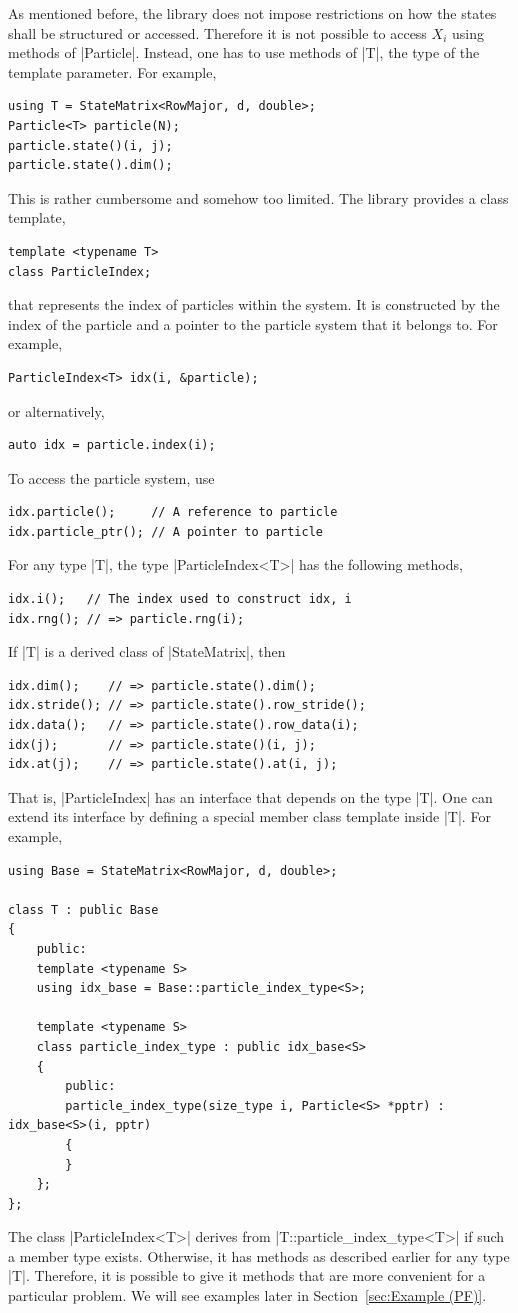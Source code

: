 As mentioned before, the library does not impose restrictions on how the states
shall be structured or accessed. Therefore it is not possible to access $X_i$
using methods of |Particle|. Instead, one has to use methods of |T|, the type
of the template parameter. For example,
\begin{Verbatim}
using T = StateMatrix<RowMajor, d, double>;
Particle<T> particle(N);
particle.state()(i, j);
particle.state().dim();
\end{Verbatim}
This is rather cumbersome and somehow too limited. The library provides a class
template,
\begin{Verbatim}
template <typename T>
class ParticleIndex;
\end{Verbatim}
that represents the index of particles within the system. It is constructed by
the index of the particle and a pointer to the particle system that it belongs
to. For example,
\begin{Verbatim}
ParticleIndex<T> idx(i, &particle);
\end{Verbatim}
or alternatively,
\begin{Verbatim}
auto idx = particle.index(i);
\end{Verbatim}
To access the particle system, use
\begin{Verbatim}
idx.particle();     // A reference to particle
idx.particle_ptr(); // A pointer to particle
\end{Verbatim}
For any type |T|, the type |ParticleIndex<T>| has the following methods,
\begin{Verbatim}
idx.i();   // The index used to construct idx, i
idx.rng(); // => particle.rng(i);
\end{Verbatim}
If |T| is a derived class of |StateMatrix|, then
\begin{Verbatim}
idx.dim();    // => particle.state().dim();
idx.stride(); // => particle.state().row_stride();
idx.data();   // => particle.state().row_data(i);
idx(j);       // => particle.state()(i, j);
idx.at(j);    // => particle.state().at(i, j);
\end{Verbatim}
That is, |ParticleIndex| has an interface that depends on the type |T|. One can
extend its interface by defining a special member class template inside |T|.
For example,
\begin{Verbatim}
using Base = StateMatrix<RowMajor, d, double>;

class T : public Base
{
    public:
    template <typename S>
    using idx_base = Base::particle_index_type<S>;

    template <typename S>
    class particle_index_type : public idx_base<S>
    {
        public:
        particle_index_type(size_type i, Particle<S> *pptr) : idx_base<S>(i, pptr)
        {
        }
    };
};
\end{Verbatim}
The class |ParticleIndex<T>| derives from |T::particle_index_type<T>| if such a
member type exists. Otherwise, it has methods as described earlier for any type
|T|. Therefore, it is possible to give it methods that are more convenient for
a particular problem. We will see examples later in Section~\ref{sec:Example
(PF)}.

